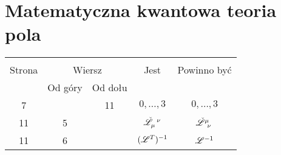 \documentclass[a4paper,11pt]{article}
\begin{document}
\vspace{\spaceTwo}










\section{Matematyczna kwantowa teoria pola}

\vspace{\spaceTwo}













\begin{center}

  \begin{tabular}{|c|c|c|c|c|}
    \hline
    & \multicolumn{2}{c|}{} & & \\
    Strona & \multicolumn{2}{c|}{Wiersz} & Jest
                              & Powinno być \\ \cline{2-3}
    & Od góry & Od dołu & & \\
    \hline
    7   & & 11 & $0,\ldots,\!3$ & $0,\ldots, 3$ \\
    11  &  5 & & $\tensor{ \check{ \Lcal } }{ _{ \mu }^{ \nu } }$
           & $\tensor{ \check{ \Lcal } }{ ^{ \mu }_{ \nu } }$ \\
    11  &  6 & & $( \mathcal{L}^{ T } )^{ -1 }$ & $\mathcal{L}^{ -1 }$ \\
    \hline
  \end{tabular}

\end{center}
\end{document}
